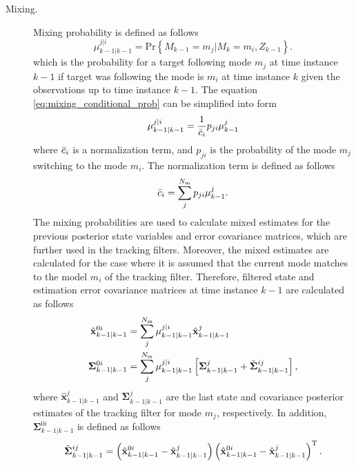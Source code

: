 \documentclass[english, 12pt, a4paper, elec, utf8, a-1b, online]{aaltothesis}
\renewcommand{\vec}[1]{\mathbf{#1}}
\renewcommand{\Pr}[1]{\text{Pr}\left\{ #1 \right\}}
\newcommand{\transpose}[1]{#1^\text{T}}
\newcommand{\lastmxprobs}{\mu^{j|i}_{k-1|k-1}}
\newcommand{\mxnorm}{ \Bar{c}_i }
\newcommand{\xmxinit}{\hat{\vec{x}}^{0i}_{k-1|k-1}}
\newcommand{\ecovmxinit}{\bm{\Sigma}^{0i}_{k-1|k-1}}
\newcommand{\modexlast}{\hat{\vec{x}}^{j}_{k-1|k-1}}
\newcommand{\modecovlast}{\bm{\Sigma}^j_{k-1|k-1}}
\newcommand{\modemxcovlast}{\Tilde{\bm{\Sigma}}^{ij}_{k-1|k-1}}
\newcommand{\nmodels}{{N_\text{m}}}
\begin{document}
\begin{description}
\item[Mixing.]

Mixing probability is defined as follows
\begin{equation}\label{eq:mixing_conditional_prob}
    \lastmxprobs = \Pr{M_{k-1}=m_j|M_{k}=m_i, Z_{k-1}}.
\end{equation}
which is the probability for a target following mode $m_j$ at time instance $k-1$ if target was following the mode is $m_i$ at time instance $k$ given the observations up to time instance $k-1$.
The equation \eqref{eq:mixing_conditional_prob} can be simplified into form
\begin{equation}
    \lastmxprobs = \frac{1}{\mxnorm} p_{ji} \mu^j_{k-1} \label{eq:imm_mx_probs}
\end{equation}
where $\mxnorm$ is a normalization term, and $p_{ji}$ is the probability of the mode $m_j$ switching to the mode $m_i$. 
The normalization term is defined as follows
\begin{equation}
    \mxnorm = \sum_j^\nmodels p_{ji} \mu^j_{k-1}. \label{eq:imm_mx_normalization}
\end{equation}
The mixing probabilities are used to calculate mixed estimates for the previous posterior state variables and error covariance matrices, which are further used in the tracking filters.
Moreover, the mixed estimates are calculated for the case where it is assumed that the current mode matches to the model $m_i$ of the tracking filter.
Therefore, filtered state and estimation error covariance matrices at time instance $k-1$ are calculated as follows
\begin{subequations}
\begin{align}
    \xmxinit &= \sum_j^\nmodels \lastmxprobs \modexlast \label{eq:imm_mx_init_x}\\
    \ecovmxinit &= \sum_j^\nmodels \lastmxprobs \left[ \modecovlast + \modemxcovlast \right], \label{eq:imm_mx_init_P}
\end{align}
\end{subequations}
where $\modexlast$ and $\modecovlast$ are the last state and covariance posterior estimates of the tracking filter for mode $m_j$, respectively. 
In addition, $\ecovmxinit$ is defined as follows
\begin{equation}
    \modemxcovlast = 
    \left( \xmxinit - \modexlast  \right) 
    \transpose{\left( \xmxinit - \modexlast   \right)}.\label{eq:imm_mx_init_Ptilde}
\end{equation}


\end{description}
\end{document}
